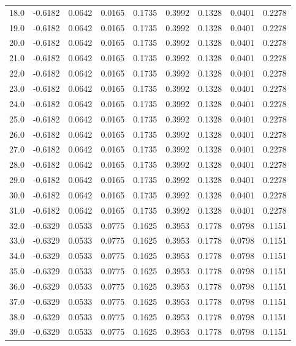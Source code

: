 \begin{longtable}{lrrrrrrrr}
18.0 & -0.6182 & 0.0642 & 0.0165 & 0.1735 & 0.3992 & 0.1328 & 0.0401 & 0.2278 \\
19.0 & -0.6182 & 0.0642 & 0.0165 & 0.1735 & 0.3992 & 0.1328 & 0.0401 & 0.2278 \\
20.0 & -0.6182 & 0.0642 & 0.0165 & 0.1735 & 0.3992 & 0.1328 & 0.0401 & 0.2278 \\
21.0 & -0.6182 & 0.0642 & 0.0165 & 0.1735 & 0.3992 & 0.1328 & 0.0401 & 0.2278 \\
22.0 & -0.6182 & 0.0642 & 0.0165 & 0.1735 & 0.3992 & 0.1328 & 0.0401 & 0.2278 \\
23.0 & -0.6182 & 0.0642 & 0.0165 & 0.1735 & 0.3992 & 0.1328 & 0.0401 & 0.2278 \\
24.0 & -0.6182 & 0.0642 & 0.0165 & 0.1735 & 0.3992 & 0.1328 & 0.0401 & 0.2278 \\
25.0 & -0.6182 & 0.0642 & 0.0165 & 0.1735 & 0.3992 & 0.1328 & 0.0401 & 0.2278 \\
26.0 & -0.6182 & 0.0642 & 0.0165 & 0.1735 & 0.3992 & 0.1328 & 0.0401 & 0.2278 \\
27.0 & -0.6182 & 0.0642 & 0.0165 & 0.1735 & 0.3992 & 0.1328 & 0.0401 & 0.2278 \\
28.0 & -0.6182 & 0.0642 & 0.0165 & 0.1735 & 0.3992 & 0.1328 & 0.0401 & 0.2278 \\
29.0 & -0.6182 & 0.0642 & 0.0165 & 0.1735 & 0.3992 & 0.1328 & 0.0401 & 0.2278 \\
30.0 & -0.6182 & 0.0642 & 0.0165 & 0.1735 & 0.3992 & 0.1328 & 0.0401 & 0.2278 \\
31.0 & -0.6182 & 0.0642 & 0.0165 & 0.1735 & 0.3992 & 0.1328 & 0.0401 & 0.2278 \\
32.0 & -0.6329 & 0.0533 & 0.0775 & 0.1625 & 0.3953 & 0.1778 & 0.0798 & 0.1151 \\
33.0 & -0.6329 & 0.0533 & 0.0775 & 0.1625 & 0.3953 & 0.1778 & 0.0798 & 0.1151 \\
34.0 & -0.6329 & 0.0533 & 0.0775 & 0.1625 & 0.3953 & 0.1778 & 0.0798 & 0.1151 \\
35.0 & -0.6329 & 0.0533 & 0.0775 & 0.1625 & 0.3953 & 0.1778 & 0.0798 & 0.1151 \\
36.0 & -0.6329 & 0.0533 & 0.0775 & 0.1625 & 0.3953 & 0.1778 & 0.0798 & 0.1151 \\
37.0 & -0.6329 & 0.0533 & 0.0775 & 0.1625 & 0.3953 & 0.1778 & 0.0798 & 0.1151 \\
38.0 & -0.6329 & 0.0533 & 0.0775 & 0.1625 & 0.3953 & 0.1778 & 0.0798 & 0.1151 \\
39.0 & -0.6329 & 0.0533 & 0.0775 & 0.1625 & 0.3953 & 0.1778 & 0.0798 & 0.1151 \\

\end{longtable}
